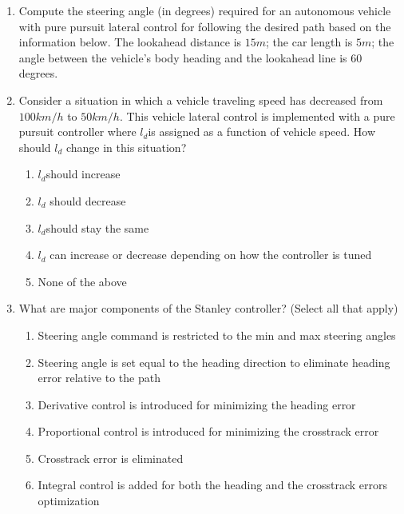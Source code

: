 \begin{enumerate}
\item Compute the steering angle (in degrees) required for an autonomous vehicle with pure pursuit lateral 
control for following the desired path based on the information below.
The lookahead distance is $15m$; the car length is $5m$; the angle between the vehicle’s body heading and the lookahead line is 60 degrees.

\item Consider a situation in which a vehicle traveling speed has decreased from $100km/h$ to $50km/h$. 
This vehicle lateral control is implemented with a pure pursuit controller where $l_d$​ is assigned as a function of vehicle speed. 
How should $l_d$ change in this situation?
	\begin{enumerate}
		\item  $l_d$​ should increase
		\item  $l_d$ should decrease
		\item  $l_d$​ should stay the same
		\item  $l_d$ can increase or decrease depending on how the controller is tuned
		\item None of the above
	\end{enumerate}
\item What are major components of the Stanley controller? (Select all that apply)

	\begin{enumerate}
		\item  Steering angle command is restricted to the min and max steering angles
		\item Steering angle is set equal to the heading direction to eliminate heading error relative to the path
		\item Derivative control is introduced for minimizing the heading error
		\item Proportional control is introduced for minimizing the crosstrack error
		\item Crosstrack error is eliminated
		\item Integral control is added for both the heading and the crosstrack errors optimization 
	\end{enumerate}


\end{enumerate}
